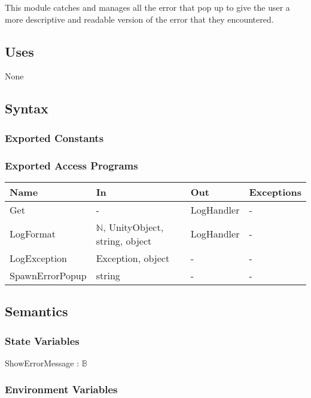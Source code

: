 \documentclass[12pt, titlepage]{article}
\begin{document}
This module catches and manages all the error that pop up to give the user a more descriptive and readable version of the error that they encountered.

\subsection{Uses}

None

\subsection{Syntax}

\subsubsection{Exported Constants}

\subsubsection{Exported Access Programs}

\begin{center}
\begin{tabular}{p{3.2cm} p{4cm} p{4cm} p{2cm}}
\hline
\textbf{Name} & \textbf{In} & \textbf{Out} & \textbf{Exceptions} \\
\hline
Get & - & LogHandler & - \\
LogFormat & $\mathds{N}$, UnityObject, string, object & LogHandler & - \\
LogException & Exception, object & - &-\\
SpawnErrorPopup & string & - & - \\
\hline
\end{tabular}
\end{center}

\subsection{Semantics}

\subsubsection{State Variables}

ShowErrorMessage : $\mathds{B}$

\subsubsection{Environment Variables}
\end{document}
